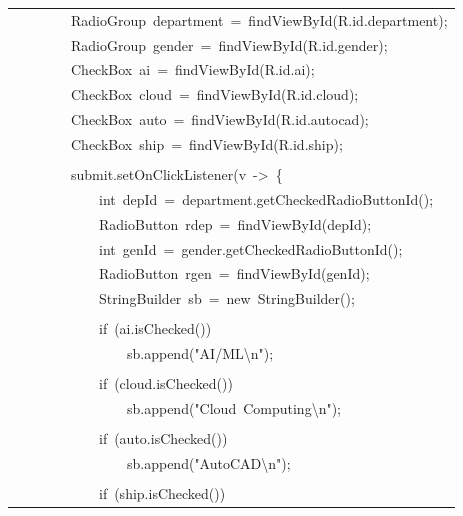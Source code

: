 \documentclass[a4paper,12pt]{article}
\begin{document}
\begin{longtable}{|p{}|}
{\ttfamily\small \ \ \ \ \ \ \ \ RadioGroup\ department\ =\ findViewById(R.id.department);} \\
{\ttfamily\small \ \ \ \ \ \ \ \ RadioGroup\ gender\ =\ findViewById(R.id.gender);} \\
{\ttfamily\small \ \ \ \ \ \ \ \ CheckBox\ ai\ =\ findViewById(R.id.ai);} \\
{\ttfamily\small \ \ \ \ \ \ \ \ CheckBox\ cloud\ =\ findViewById(R.id.cloud);} \\
{\ttfamily\small \ \ \ \ \ \ \ \ CheckBox\ auto\ =\ findViewById(R.id.autocad);} \\
{\ttfamily\small \ \ \ \ \ \ \ \ CheckBox\ ship\ =\ findViewById(R.id.ship);} \\
\strut \\
{\ttfamily\small \ \ \ \ \ \ \ \ submit.setOnClickListener(v\ -\textgreater{}\ \{} \\
{\ttfamily\small \ \ \ \ \ \ \ \ \ \ \ \ int\ depId\ =\ department.getCheckedRadioButtonId();} \\
{\ttfamily\small \ \ \ \ \ \ \ \ \ \ \ \ RadioButton\ rdep\ =\ findViewById(depId);} \\
{\ttfamily\small \ \ \ \ \ \ \ \ \ \ \ \ int\ genId\ =\ gender.getCheckedRadioButtonId();} \\
{\ttfamily\small \ \ \ \ \ \ \ \ \ \ \ \ RadioButton\ rgen\ =\ findViewById(genId);} \\
{\ttfamily\small \ \ \ \ \ \ \ \ \ \ \ \ StringBuilder\ sb\ =\ new\ StringBuilder();} \\
\strut \\
{\ttfamily\small \ \ \ \ \ \ \ \ \ \ \ \ if\ (ai.isChecked())} \\
{\ttfamily\small \ \ \ \ \ \ \ \ \ \ \ \ \ \ \ \ sb.append("AI/ML\textbackslash{}n");} \\
\strut \\
{\ttfamily\small \ \ \ \ \ \ \ \ \ \ \ \ if\ (cloud.isChecked())} \\
{\ttfamily\small \ \ \ \ \ \ \ \ \ \ \ \ \ \ \ \ sb.append("Cloud\ Computing\textbackslash{}n");} \\
\strut \\
{\ttfamily\small \ \ \ \ \ \ \ \ \ \ \ \ if\ (auto.isChecked())} \\
{\ttfamily\small \ \ \ \ \ \ \ \ \ \ \ \ \ \ \ \ sb.append("AutoCAD\textbackslash{}n");} \\
\strut \\
{\ttfamily\small \ \ \ \ \ \ \ \ \ \ \ \ if\ (ship.isChecked())} \\

\end{longtable}
\end{document}
